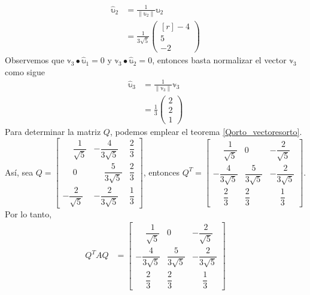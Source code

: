 \begin{example}
    \begin{align*}
        \hat{\mathbb{u}}_2 & = \frac{1}{\| \mathbb{u}_2 \|} \mathbb{u}_2 \\
        & = \frac{1}{3\sqrt{5}} \begin{pmatrix*}[r]
            -4 \\
            5 \\
            -2
        \end{pmatrix*}
    \end{align*}
    Observemos que $\mathbb{v}_3 \bullet \hat{\mathbb{u}}_1 = 0$ y $\mathbb{v}_3 \bullet \hat{\mathbb{u}}_2 = 0$, entonces basta normalizar el vector $\mathbb{v}_3$ como sigue
    \begin{align*}
        \hat{\mathbb{u}}_3 & = \frac{1}{\| \mathbb{v}_3 \|} \mathbb{v}_3 \\
        & = \frac{1}{3} \begin{pmatrix}
            2 \\
            2 \\
            1
        \end{pmatrix}
    \end{align*}
    Para determinar la matriz $Q$, podemos emplear el teorema \ref{Qorto_vectoresorto}. Así, sea $Q = \begin{bmatrix}
        \phantom{-} \dfrac{1}{\sqrt{5}} & - \dfrac{4}{3\sqrt{5}} & \dfrac{2}{3} \\[3mm]
        \phantom{-} 0 & \phantom{-} \dfrac{5}{3\sqrt{5}} & \dfrac{2}{3} \\[3mm]
        - \dfrac{2}{\sqrt{5}} & - \dfrac{2}{3\sqrt{5}} & \dfrac{1}{3}
    \end{bmatrix}$, entonces $Q^T = \begin{bmatrix}
        \phantom{-} \dfrac{1}{\sqrt{5}} & 0 & -\dfrac{2}{\sqrt{5}} \\[3mm]
        -\dfrac{4}{3\sqrt{5}} & \dfrac{5}{3\sqrt{5}} & - \dfrac{2}{3\sqrt{5}} \\[3mm]
        \phantom{-} \dfrac{2}{3} & \dfrac{2}{3} & \phantom{-} \dfrac{1}{3}
    \end{bmatrix}$. Por lo tanto,
    \begin{align*}
        Q^T A Q & = \begin{bmatrix}
            \phantom{-} \dfrac{1}{\sqrt{5}} & 0 & -\dfrac{2}{\sqrt{5}} \\[3mm]
            -\dfrac{4}{3\sqrt{5}} & \dfrac{5}{3\sqrt{5}} & - \dfrac{2}{3\sqrt{5}} \\[3mm]
            \phantom{-} \dfrac{2}{3} & \dfrac{2}{3} & \phantom{-} \dfrac{1}{3}

\end{bmatrix}
\end{align*}
\end{example}
